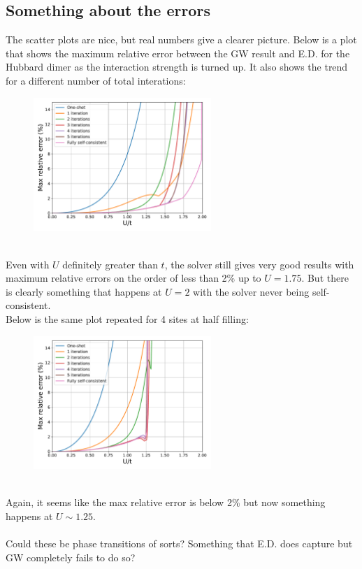 \documentclass[12pt]{article}
\begin{document}
\subsection*{Something about the errors}
The scatter plots are nice, but real numbers give a clearer picture. Below is a plot that shows the maximum relative error between the GW result and E.D. for the Hubbard dimer as the interaction strength is turned up. It also shows the trend for a different number of total interations:
\begin{figure}[h!]
\centering
\includegraphics[width=0.6\textwidth]{errors2.pdf}
\end{figure}\\
Even with $U$ definitely greater than $t$, the solver still gives very good results with maximum relative errors on the order of less than 2\% up to $U=1.75$. But there is clearly something that happens at $U = 2$ with the solver never being self-consistent.\\
Below is the same plot repeated for 4 sites at half filling:
\begin{figure}[h!]
\centering
\includegraphics[width=0.6\textwidth]{errors4.pdf}
\end{figure}\\
Again, it seems like the max relative error is below 2\% but now something happens at $U\sim 1.25$.\\
\\
Could these be phase transitions of sorts? Something that E.D. does capture but GW completely fails to do so?
\newpage
\noindent
\end{document}
